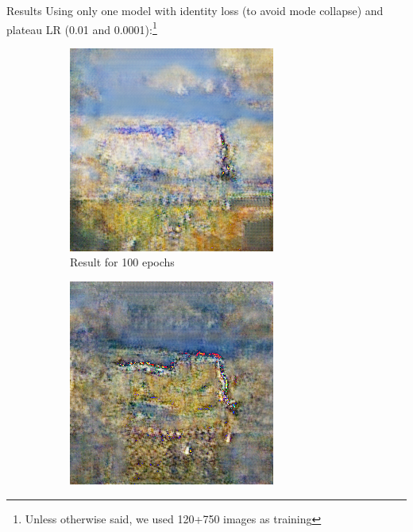 \documentclass[12pt]{beamer}
\begin{document}
    \begin{frame}{Results}
        Using only one model with identity loss (to avoid mode collapse) and plateau LR (0.01 and 0.0001):\footnote{Unless otherwise said, we used 120+750 images as training}
        
        \begin{figure}[H]
            \centering
            \begin{subfigure}[b]{0.3\textwidth}
                \centering
                \includegraphics[width=\textwidth]{resources/cycle-gan/on100.png}
                \caption{Result for 100 epochs}
            \end{subfigure}
            \hfill
            \begin{subfigure}[b]{0.3\textwidth}
                \centering
                \includegraphics[width=\textwidth]{resources/cycle-gan/on.png}

\end{subfigure}
\end{figure}
\end{frame}
\end{document}
